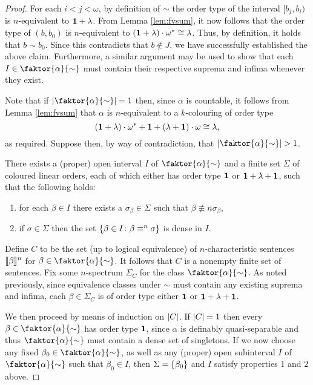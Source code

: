 \begin{proof}
	For each $i<j<\omega$, by definition of $\sim$ the order type of the
	interval $[b_{j},b_{i})$ is $n$-equivalent to $\mathbf{1}+\lambda$.  From Lemma
	\ref{lem:fvsum}, it now follows that the order type of $(b,b_{0})$ is
	$n$-equivalent to $(\mathbf{1}+\lambda)\cdot{\omega}^\ast\cong\lambda$.  Thus, by
	definition, it holds that $b\sim b_{0}$.  Since this contradicts that
	$b\notin J$, we have successfully established the above claim.  Furthermore,
	a similar argument may be used to show that each $I\in\faktor{\alpha}{\sim}$
	must contain their respective suprema and infima whenever they exist.

	Note that if $\card{\faktor{\alpha}{\sim}}=1$ then, since $\alpha$ is
	countable, it follows from Lemma \ref{lem:fvsum} that $\alpha$ is $n$-equivalent
	to a $k$-colouring of order type
	\begin{equation}
		(\mathbf{1}+\lambda)\cdot{\omega}^\ast+\mathbf{1}+(\lambda+\mathbf{1})\cdot\omega\cong\lambda,
	\end{equation}
	as required.  Suppose then, by way of contradiction, that
	$\card{\faktor{\alpha}{\sim}}>1$.
	\begin{claim}
		There exists a (proper) open interval $I$ of $\faktor{\alpha}{\sim}$ and
		a finite set $\Sigma$ of coloured linear orders, each of which either has order
		type $\mathbf{1}$ or $\mathbf{1}+\lambda+\mathbf{1}$, such that the following holds:
		\begin{enumerate}[nosep]
			\item for each $\beta\in I$ there exists a $\sigma_\beta\in\Sigma$
			      such that $\beta\nequiv{n}\sigma_\beta$,

			\item if $\sigma\in\Sigma$ then the set $\left\lbrace \beta\in I\colon \beta\equiv^{n}\sigma \right\rbrace$ is dense in $I$.
		\end{enumerate}
	\end{claim}

	Define $C$ to be the set (up to logical equivalence) of $n$-characteristic
	sentences $\llbracket\beta\rrbracket^{n}$ for $\beta\in\faktor{\alpha}{\sim}$. It follows that
	$C$ is a nonempty finite set of sentences. Fix some $n$-spectrum $\Sigma_{C}$
	for the class $\faktor{\alpha}{\sim}$.  As noted previously, since equivalence
	classes under $\sim$ must contain any existing suprema and infima, each
	$\beta\in\Sigma_C$ is of order type either $\mathbf{1}$ or $\mathbf{1}+\lambda+\mathbf{1}$.

	We then proceed by means of induction on $\left\lvert C\right\rvert$. If $\left\lvert C\right\rvert=1$ then
	every $\beta\in\faktor{\alpha}{\sim}$ has order type $\mathbf{1}$, since $\alpha$ is
	definably quasi-separable and thus $\faktor{\alpha}{\sim}$ must contain a dense
	set of singletons.  If we now choose any fixed
	$\beta_0\in\faktor{\alpha}{\sim}$, as well as any (proper) open subinterval $I$
	of $\faktor{\alpha}{\sim}$ such that $\beta_0\in I$, then $\Sigma=\left\lbrace \beta_0\right\rbrace$
	and $I$ satisfy properties 1 and 2 above.


\end{proof}

